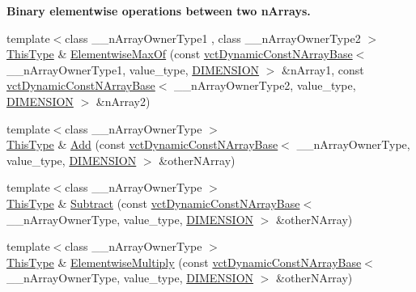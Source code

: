 \begin{Indent}{\bf Binary elementwise operations between two n\+Arrays.}
\begin{DoxyCompactItemize}
\item 
{\footnotesize template$<$class \+\_\+\+\_\+n\+Array\+Owner\+Type1 , class \+\_\+\+\_\+n\+Array\+Owner\+Type2 $>$ }\\\hyperlink{classvct_dynamic_const_n_array_base_a5123caffcf1455a1b99003877eade897}{This\+Type} \& \hyperlink{classvct_dynamic_n_array_base_a826cf1c9b042aeecf4f4294a48130819}{Elementwise\+Max\+Of} (const \hyperlink{classvct_dynamic_const_n_array_base}{vct\+Dynamic\+Const\+N\+Array\+Base}$<$ \+\_\+\+\_\+n\+Array\+Owner\+Type1, value\+\_\+type, \hyperlink{classvct_dynamic_n_array_base_aa66532d28588bdf26d08fb593db815d6abfcde386ec801b212d7c42d63a4f3837}{D\+I\+M\+E\+N\+S\+I\+O\+N} $>$ \&n\+Array1, const \hyperlink{classvct_dynamic_const_n_array_base}{vct\+Dynamic\+Const\+N\+Array\+Base}$<$ \+\_\+\+\_\+n\+Array\+Owner\+Type2, value\+\_\+type, \hyperlink{classvct_dynamic_n_array_base_aa66532d28588bdf26d08fb593db815d6abfcde386ec801b212d7c42d63a4f3837}{D\+I\+M\+E\+N\+S\+I\+O\+N} $>$ \&n\+Array2)
\item 
{\footnotesize template$<$class \+\_\+\+\_\+n\+Array\+Owner\+Type $>$ }\\\hyperlink{classvct_dynamic_const_n_array_base_a5123caffcf1455a1b99003877eade897}{This\+Type} \& \hyperlink{classvct_dynamic_n_array_base_a3b5417da66f0818cc8ce585d7e5aa351}{Add} (const \hyperlink{classvct_dynamic_const_n_array_base}{vct\+Dynamic\+Const\+N\+Array\+Base}$<$ \+\_\+\+\_\+n\+Array\+Owner\+Type, value\+\_\+type, \hyperlink{classvct_dynamic_n_array_base_aa66532d28588bdf26d08fb593db815d6abfcde386ec801b212d7c42d63a4f3837}{D\+I\+M\+E\+N\+S\+I\+O\+N} $>$ \&other\+N\+Array)
\item 
{\footnotesize template$<$class \+\_\+\+\_\+n\+Array\+Owner\+Type $>$ }\\\hyperlink{classvct_dynamic_const_n_array_base_a5123caffcf1455a1b99003877eade897}{This\+Type} \& \hyperlink{classvct_dynamic_n_array_base_ab66a869507b8168c7c74c5524a736e29}{Subtract} (const \hyperlink{classvct_dynamic_const_n_array_base}{vct\+Dynamic\+Const\+N\+Array\+Base}$<$ \+\_\+\+\_\+n\+Array\+Owner\+Type, value\+\_\+type, \hyperlink{classvct_dynamic_n_array_base_aa66532d28588bdf26d08fb593db815d6abfcde386ec801b212d7c42d63a4f3837}{D\+I\+M\+E\+N\+S\+I\+O\+N} $>$ \&other\+N\+Array)
\item 
{\footnotesize template$<$class \+\_\+\+\_\+n\+Array\+Owner\+Type $>$ }\\\hyperlink{classvct_dynamic_const_n_array_base_a5123caffcf1455a1b99003877eade897}{This\+Type} \& \hyperlink{classvct_dynamic_n_array_base_af2c3d2a597e225ecb0a9d1be15cdf141}{Elementwise\+Multiply} (const \hyperlink{classvct_dynamic_const_n_array_base}{vct\+Dynamic\+Const\+N\+Array\+Base}$<$ \+\_\+\+\_\+n\+Array\+Owner\+Type, value\+\_\+type, \hyperlink{classvct_dynamic_n_array_base_aa66532d28588bdf26d08fb593db815d6abfcde386ec801b212d7c42d63a4f3837}{D\+I\+M\+E\+N\+S\+I\+O\+N} $>$ \&other\+N\+Array)

\end{DoxyCompactItemize}
\end{Indent}
